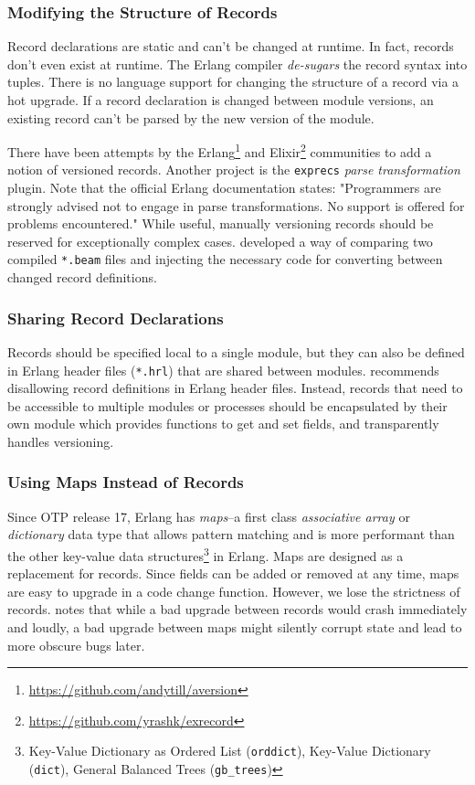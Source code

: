 \subsubsection{Modifying the Structure of Records}
Record declarations are static and can't be changed at runtime. In fact, records don't even exist at runtime. The Erlang compiler \emph{de-sugars} the record syntax into tuples. There is no language support for changing the structure of a record via a hot upgrade. If a record declaration is changed between module versions, an existing record can't be parsed by the new version of the module.

There have been attempts by the Erlang\footnote{\url{https://github.com/andytill/aversion}} and Elixir\footnote{\url{https://github.com/yrashk/exrecord}} communities to add a notion of versioned records. Another project is the \lstinline|exprecs| \emph{parse transformation} plugin. Note that the official Erlang documentation states: "Programmers are strongly advised not to engage in parse transformations. No support is offered for problems encountered." While useful, manually versioning records should be reserved for exceptionally complex cases. \cite{rebar3appup} developed a way of comparing two compiled \lstinline|*.beam| files and injecting the necessary code for converting between changed record definitions.

\subsubsection{Sharing Record Declarations}
Records should be specified local to a single module, but they can also be defined in Erlang header files (\lstinline|*.hrl|) that are shared between modules. \cite{davis:talk} recommends disallowing record definitions in Erlang header files. Instead, records that need to be accessible to multiple modules or processes should be encapsulated by their own module which provides functions to get and set fields, and transparently handles versioning.

\subsubsection{Using Maps Instead of Records}
Since OTP release 17, Erlang has \emph{maps}--a first class \emph{associative array} or \emph{dictionary} data type that allows pattern matching and is more performant than the other key-value data structures\footnote{Key-Value Dictionary as Ordered List (\lstinline|orddict|), Key-Value Dictionary (\lstinline|dict|), General Balanced Trees (\lstinline|gb_trees|)} in Erlang. Maps are designed as a replacement for records. Since fields can be added or removed at any time, maps are easy to upgrade in a code change function. However, we lose the strictness of records. \cite{ferd} notes that while a bad upgrade between records would crash immediately and loudly, a bad upgrade between maps might silently corrupt state and lead to more obscure bugs later.


